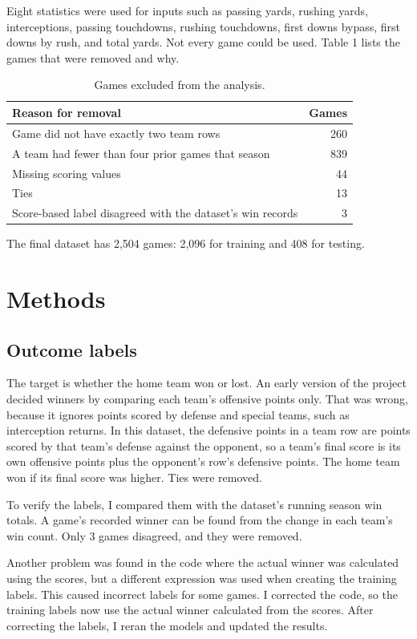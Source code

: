 \documentclass[sigconf,nonacm]{acmart}
\begin{document}
Eight statistics were used for inputs such as passing yards, rushing yards, interceptions, passing touchdowns, rushing touchdowns, first downs bypass, first downs by rush, and total yards. Not every game could be used. Table 1 lists the games that were removed and why.

\begin{table}[t]
\centering
\footnotesize
\begin{tabular}{@{}p{}r@{}}
\toprule
Reason for   removal & Games \\
\midrule
Game did not   have exactly two team rows & 260 \\
A team had   fewer than four prior games that season & 839 \\
Missing   scoring values & 44 \\
Ties & 13 \\
Score-based   label disagreed with the dataset's win records & 3 \\
\bottomrule
\end{tabular}
\caption{Games excluded from the analysis.}
\end{table}
The final dataset has 2,504 games: 2,096 for training and 408 for testing.

\section{Methods}
\subsection{Outcome labels}
The target is whether the home team won or lost. An early version of the project decided winners by comparing each team's offensive points only. That was wrong, because it ignores points scored by defense and special teams, such as interception returns. In this dataset, the defensive points in a team row are points scored by that team's defense against the opponent, so a team's final score is its own offensive points plus the opponent's row's defensive points. The home team won if its final score was higher. Ties were removed.

To verify the labels, I compared them with the dataset's running season win totals. A game's recorded winner can be found from the change in each team's win count. Only 3 games disagreed, and they were removed.

Another problem was found in the code where the actual winner was calculated using the scores, but a different expression was used when creating the training labels. This caused incorrect labels for some games. I corrected the code, so the training labels now use the actual winner calculated from the scores. After correcting the labels, I reran the models and updated the results.
\end{document}
